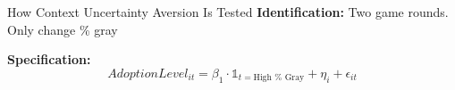 \documentclass[
  ignorenonframetext,
]{beamer}
\begin{document}
\begin{frame}{How Context Uncertainty Aversion Is Tested}
\protect\hypertarget{how-context-uncertainty-aversion-is-tested}{}
\textbf{Identification:} Two game rounds. Only change \% gray

\begin{figure}

\begin{minipage}[t]{0.50\linewidth}

{\centering 


}

\end{minipage}%
%
\begin{minipage}[t]{0.50\linewidth}

{\centering 


}

\end{minipage}%

\end{figure}

\textbf{Specification:} \[
AdoptionLevel_{it} = \beta_1 \cdot \mathbb{1}_{t = \text{High } \% \text{ Gray}} + \eta_i + \epsilon_{it}
\]
\end{frame}
\end{document}
